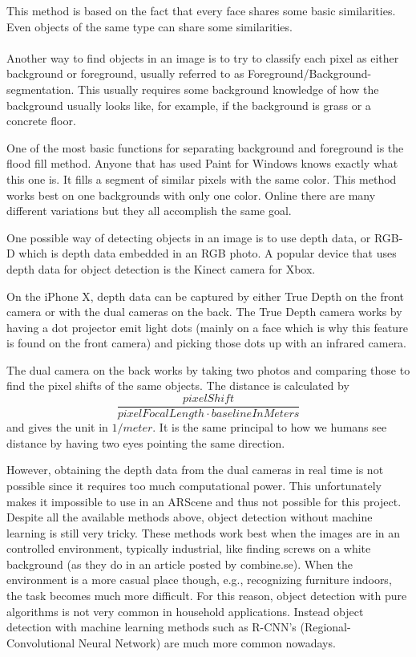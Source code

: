 This method is based on the fact that every face shares some basic similarities. Even objects of the same type can share some similarities.\cite{violaJones}
\\\\
Another way to find objects in an image is to try to classify each pixel as either background or foreground, usually referred to as Foreground/Background-segmentation. This usually requires some background knowledge of how the background usually looks like, for example, if the background is grass or a concrete floor.

One of the most basic functions for separating background and foreground is the flood fill method.
Anyone that has used Paint for Windows knows exactly what this one is. It fills a segment of similar pixels with the same color. This method works best on one backgrounds with only one color.
Online there are many different variations but they all accomplish the same goal.\cite{floodFill}

One possible way of detecting objects in an image is to use depth data, or RGB-D which is depth data embedded in an RGB photo.
A popular device that uses depth data for object detection is the Kinect camera
for Xbox.

On the iPhone X, depth data can be captured by either True Depth on the front camera or with the dual cameras on the back. The True Depth camera works by having a dot projector emit light dots (mainly on a face which is why this feature is found on the front camera) and picking those dots up with an infrared camera.

The dual camera on the back works by taking two photos and comparing those to find the pixel shifts of the same objects. The distance is calculated by \[ \frac{pixelShift} { pixelFocalLength \cdot baselineInMeters}\] and gives the unit in $1/meter$. It is the same principal to how we humans see distance by having two eyes pointing the same direction. \cite{depthMap}

However, obtaining the depth data from the dual cameras in real time is not possible since it requires too much computational power. This unfortunately makes it impossible to use in an ARScene and thus not possible for this project.\\

Despite all the available methods above, object detection without machine learning is still very tricky. These methods work best when the images are in an controlled environment, typically industrial, like finding screws on a white background (as they do in an article posted by combine.se). \cite{combine}
When the environment is a more casual place though, e.g., recognizing furniture indoors, the task becomes much more difficult. For this reason, object detection with pure algorithms is not very common in household applications. Instead object detection with machine learning methods such as R-CNN's (Regional-Convolutional Neural Network) are much more common nowadays.

